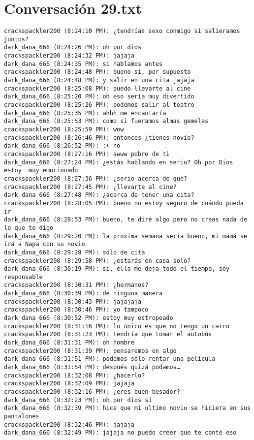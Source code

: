 \section{Conversaci\'on 29.txt}

\begin{verbatim}
crackspackler200 (8:24:10 PM): ¿tendrías sexo conmigo si salieramos juntos?
dark_dana_666 (8:24:26 PM): oh por dios
crackspackler200 (8:24:32 PM): jajaja
dark_dana_666 (8:24:35 PM): si hablamos antes
crackspackler200 (8:24:48 PM): bueno sí, por supuesto
dark_dana_666 (8:24:48 PM): y salir en una cita jajaja
crackspackler200 (8:25:08 PM): puedo llevarte al cine
dark_dana_666 (8:25:20 PM): oh eso sería muy divertido
crackspackler200 (8:25:26 PM): podemos salir al teatro
dark_dana_666 (8:25:35 PM): ahhh me encantaría
dark_dana_666 (8:25:53 PM): como si fueramos almas gemelas
crackspackler200 (8:25:59 PM): wow
crackspackler200 (8:26:46 PM): entonces ¿tienes novio?
dark_dana_666 (8:26:52 PM): :( no
crackspackler200 (8:27:16 PM): awww pobre de ti
dark_dana_666 (8:27:24 PM): ¿estás hablando en serio? Oh por Dios estoy  muy emocionado
crackspackler200 (8:27:36 PM): ¿serio acerca de qué?
crackspackler200 (8:27:45 PM): ¿llevarte al cine?
dark_dana_666 (8:27:48 PM): ¿acerca de tener una cita?
crackspackler200 (8:28:05 PM): bueno no estoy seguro de cuándo pueda ir
dark_dana_666 (8:28:53 PM): bueno, te diré algo pero no creas nada de lo que te digo
dark_dana_666 (8:29:20 PM): la proxima semana sería bueno, mi mamá se irá a Napa con su novio
dark_dana_666 (8:29:28 PM): sólo de cita
crackspackler200 (8:29:58 PM): ¿estarás en casa solo?
dark_dana_666 (8:30:19 PM): sí, ella me deja todo el tiempo, soy responsable
crackspackler200 (8:30:31 PM): ¿hermanos?
dark_dana_666 (8:30:39 PM): de ninguna manera
crackspackler200 (8:30:43 PM): jajajaja
crackspackler200 (8:30:46 PM): yo tampoco
dark_dana_666 (8:30:52 PM): estoy muy estropeado
crackspackler200 (8:31:16 PM): lo único es que no tengo un carro
crackspackler200 (8:31:23 PM): tendría que tomar el autobús
dark_dana_666 (8:31:31 PM): oh hombre
crackspackler200 (8:31:39 PM): pensaremos en algo
dark_dana_666 (8:31:51 PM): podemos sólo rentar una película
dark_dana_666 (8:31:54 PM): después quizá podamos…
crackspackler200 (8:32:08 PM): ¿hacerlo?
crackspackler200 (8:32:09 PM): jajaja
crackspackler200 (8:32:16 PM): ¿eres buen besador?
dark_dana_666 (8:32:23 PM): oh por dios sí
dark_dana_666 (8:32:39 PM): hice que mi ultimo novio se hiciera en sus pantalones
crackspackler200 (8:32:46 PM): jajaja
dark_dana_666 (8:32:49 PM): jajaja no puedo creer que te conté eso

\end{verbatim}
